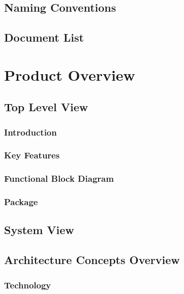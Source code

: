 \section{Naming Conventions}

\section{Document List}



\chapter{Product Overview}
\section{Top Level View}

\subsection{Introduction}


\subsection{Key Features}

\subsection{Functional Block Diagram}


\subsection{Package}

\section{System View}


\section{Architecture Concepts Overview}

\subsection{Technology}

